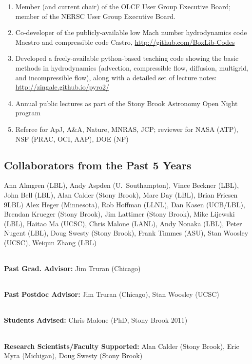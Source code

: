 \documentclass[11pt,letterpaper,english]{article}
\begin{document}
\begin{enumerate} \itemsep1pt \parskip0pt 
\item Member (and current chair) of the OLCF User Group Executive Board;
  member of the NERSC User Group Executive Board.

\item Co-developer of the publicly-available low Mach number
  hydrodynamics code Maestro and compressible code Castro,
  \url{http://github.com/BoxLib-Codes} \\

\item Developed a freely-available python-based teaching code showing
  the basic methods in hydrodynamics (advection, compressible flow,
  diffusion, multigrid, and incompressible flow), along with a detailed
  set of lecture notes: \url{http://zingale.github.io/pyro2/} \\
\item Annual public lectures as part of the Stony Brook Astronomy Open Night program
 \\

\item Referee for ApJ, A\&A, Nature, MNRAS, JCP; reviewer for NASA (ATP), NSF (PRAC, OCI, AAP), DOE (NP)
\end{enumerate}


\subsection*{Collaborators from the Past 5 Years}

Ann Almgren (LBL),
Andy Aspden (U.\ Southampton),
Vince Beckner (LBL),
John Bell (LBL),
Alan Calder (Stony Brook),
Marc Day (LBL),
Brian Friesen 9LBL)
Alex Heger (Minnesota),
Rob Hoffman (LLNL),
Dan Kasen (UCB/LBL),
Brendan Krueger (Stony Brook),
Jim Lattimer (Stony Brook),
Mike Lijewski (LBL),
Haitao Ma (UCSC),
Chris Malone (LANL),
Andy Nonaka (LBL),
Peter Nugent (LBL),
Doug Swesty (Stony Brook),
Frank Timmes (ASU),
Stan Woosley (UCSC),
Weiqun Zhang (LBL)

\ \\
{\bf Past Grad. Advisor:}
Jim Truran (Chicago)

\ \\[-4mm]
{\bf Past Postdoc Advisor:} Jim Truran (Chicago), Stan Woosley (UCSC)

\ \\[-4mm]
{\bf Students Advised:} Chris Malone (PhD, Stony Brook 2011)

\ \\[-4mm]
{\bf Research Scientists/Faculty Supported:} Alan Calder (Stony Brook),
Eric Myra (Michigan), Doug Swesty (Stony Brook)
\end{document}

